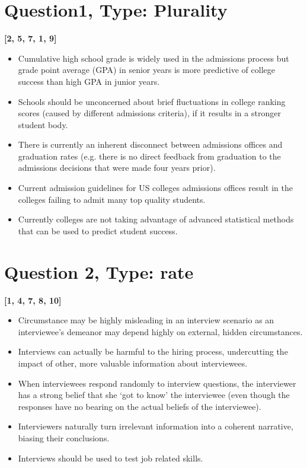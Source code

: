 \documentclass[10pt]{article}
\begin{document}
\section{Question1, Type: Plurality}
\textbf{[2, 5, 7, 1, 9]}
\begin{itemize}
\item Cumulative high school grade is widely used in the admissions process but grade point average (GPA) in senior years is more predictive of college success than high GPA in junior years.
\item Schools should be unconcerned about brief fluctuations in college ranking scores (caused by different admissions criteria), if it results in a stronger student body.
\item There is currently an inherent disconnect between admissions offices and graduation rates (e.g. there is no direct feedback from graduation to the admissions decisions that were made four years prior).
\item Current admission guidelines for US colleges admissions offices result in the colleges failing to admit many top quality students.
\item Currently colleges are not taking advantage of advanced statistical methods that can be used to predict student success.
\end{itemize}

\section{Question 2, Type: rate}
\textbf{[1, 4, 7, 8, 10]}
\begin{itemize}
\item Circumstance may be highly misleading in an interview scenario as an interviewee's demeanor may depend highly on external, hidden circumstances.
\item Interviews can actually be harmful to the hiring process, undercutting the impact of other, more valuable information about interviewees.
\item When interviewees respond randomly to interview questions, the interviewer has a strong belief that she `got to know' the interviewee (even though the responses have no bearing on the actual beliefs of the interviewee).
\item Interviewers naturally turn irrelevant information into a coherent narrative, biasing their conclusions.
\item Interviews should be used to test job related skills.
\end{itemize}
\end{document}

